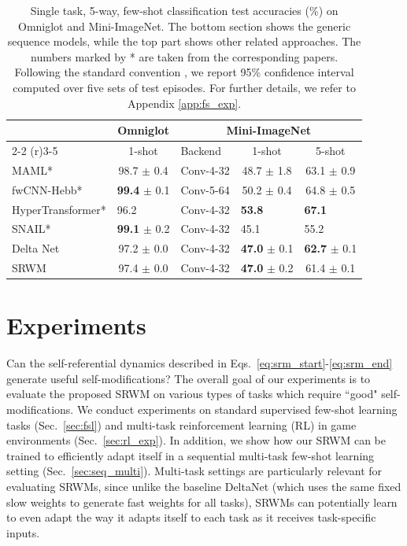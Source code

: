 \documentclass[nohyperref]{article}
\theoremstyle{plain}
\theoremstyle{definition}
\theoremstyle{remark}
\begin{document}
\begin{table}[t]
\caption{Single task, 5-way, few-shot classification test accuracies (\%) on Omniglot and Mini-ImageNet.
The bottom section shows the generic sequence models, while the top part shows other related approaches.
The numbers marked by * are taken from the corresponding papers. 
Following the standard convention \citep{RaviL17}, we report 95\% confidence interval computed over five sets of test episodes.
For further details, we refer to Appendix \ref{app:fs_exp}.
}
\label{tab:few_shot}
\vskip 0.15in
\begin{center}
\begin{tabular}{lclcc}
\toprule
       &   Omniglot  & \multicolumn{3}{c}{Mini-ImageNet} \\ \cmidrule(r){2-2} \cmidrule(r){3-5} 
        & 1-shot & Backend & 1-shot  & 5-shot  \\ \midrule
MAML* \citep{FinnAL17} &   98.7 $\pm$ 0.4 & Conv-4-32 & 48.7 $\pm$ 1.8 &  63.1 $\pm$ 0.9 \\
fwCNN-Hebb*  \citep{munkhdalai2018metalearning}  & \textbf{99.4} $\pm$ 0.1 &  Conv-5-64 & 50.2 $\pm$ 0.4 & 64.8 $\pm$ 0.5 \\
HyperTransformer* \citep{zhmoginov2022hypertransformer} &  \multicolumn{1}{l}{96.2} & Conv-4-32 & \multicolumn{1}{l}{\textbf{53.8}} & \multicolumn{1}{l}{\textbf{67.1}}\\
\midrule \midrule
SNAIL* \citep{mishra2018a} & \textbf{99.1} $\pm$ 0.2 & Conv-4-32   &  \multicolumn{1}{l}{45.1} & \multicolumn{1}{l}{55.2}  \\   %
Delta Net  & 97.2 $\pm$ 0.0 & Conv-4-32 & \textbf{47.0} $\pm$ 0.1 & \textbf{62.7} $\pm$ 0.1 \\
SRWM &  97.4 $\pm$ 0.0 & Conv-4-32 & \textbf{47.0} $\pm$ 0.2 & 61.4 $\pm$ 0.1 \\
\bottomrule
\end{tabular}
\end{center}
\vskip -0.1in
\end{table}

\section{Experiments}
Can the self-referential dynamics described in Eqs.~\ref{eq:srm_start}-\ref{eq:srm_end}  generate useful self-modifications?
The overall goal of our experiments  is to evaluate
the proposed SRWM on various types of tasks
which require ``good" self-modifications.
We conduct experiments on standard supervised few-shot learning tasks (Sec.~\ref{sec:fsl}) and multi-task reinforcement learning (RL) in game environments (Sec.~\ref{sec:rl_exp}).
In addition, we show how our SRWM can be trained to efficiently adapt itself in a sequential multi-task few-shot learning setting  (Sec.~\ref{sec:seq_multi}).
Multi-task settings are particularly
relevant for evaluating SRWMs,
since unlike the baseline DeltaNet
(which uses the same fixed slow weights to generate fast weights for all tasks),
SRWMs can potentially learn to even adapt the way it adapts itself to each task as it receives task-specific inputs.
\end{document}

